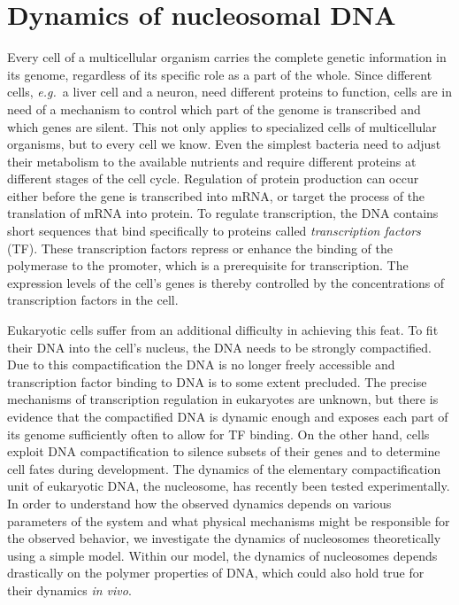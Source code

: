 \chapter{Dynamics of nucleosomal DNA}
\label{sec:nucleosome}
Every cell of a multicellular organism carries the complete genetic information in its genome, 
regardless of its specific role as a part of the whole. Since different cells, \emph{e.g.}~a liver cell
and a neuron, need different proteins to function, cells are in need of a mechanism to control
which part of the genome is transcribed and which genes are silent. This not only applies to 
specialized cells of multicellular organisms, but to every cell we know. Even the simplest bacteria 
need to adjust their metabolism to the available nutrients and require different proteins at
different stages of the cell cycle. Regulation of protein production can occur either before
the gene is transcribed into mRNA, or target the process of the translation of mRNA 
into protein. 
To regulate transcription, the DNA contains short sequences that bind specifically to 
proteins called \emph{transcription factors} (TF). These transcription factors repress or
enhance the binding of the polymerase to the promoter, which is 
a prerequisite for transcription. The expression levels of the cell's genes is thereby 
controlled by the concentrations of transcription factors in the cell.

Eukaryotic cells suffer from an additional difficulty in achieving this feat. To fit their DNA into the 
cell's nucleus, the DNA needs to be strongly compactified. Due to this compactification the DNA is 
no longer freely accessible and transcription factor binding to DNA is to some extent precluded. 
The precise mechanisms of transcription regulation
in eukaryotes are unknown, but there is evidence that the compactified DNA is dynamic enough and 
exposes each part of its genome sufficiently often to allow for TF binding. 
On the other hand, cells exploit DNA compactification to
silence subsets of their genes and to determine cell fates during development. 
The dynamics of the elementary compactification unit of eukaryotic DNA, the nucleosome, has recently
been tested experimentally. In order to understand how the observed dynamics depends 
on various parameters of the system and what physical mechanisms might be responsible 
for the observed behavior, we investigate the dynamics of nucleosomes theoretically using
a simple model. Within our model, the dynamics of nucleosomes depends drastically on the 
polymer properties of DNA, which could also hold true for their dynamics \emph{in vivo}. 

